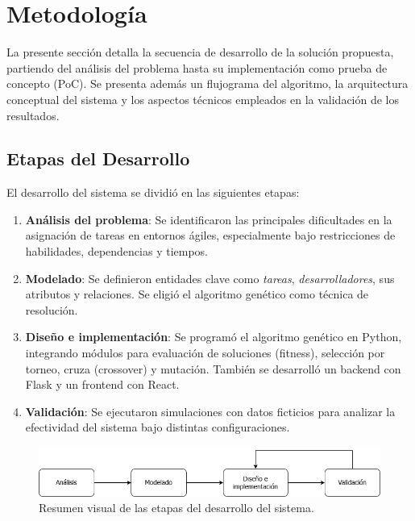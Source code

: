 \newpage

\section{Metodología}

La presente sección detalla la secuencia de desarrollo de la solución propuesta, partiendo del análisis del problema hasta su implementación como prueba de concepto (PoC). Se presenta además un flujograma del algoritmo, la arquitectura conceptual del sistema y los aspectos técnicos empleados en la validación de los resultados.

\subsection{Etapas del Desarrollo}

El desarrollo del sistema se dividió en las siguientes etapas:

\begin{enumerate}
    \item \textbf{Análisis del problema}: Se identificaron las principales dificultades en la asignación de tareas en entornos ágiles, especialmente bajo restricciones de habilidades, dependencias y tiempos.
    \item \textbf{Modelado}: Se definieron entidades clave como \textit{tareas}, \textit{desarrolladores}, sus atributos y relaciones. Se eligió el algoritmo genético como técnica de resolución.
    \item \textbf{Diseño e implementación}: Se programó el algoritmo genético en Python, integrando módulos para evaluación de soluciones (fitness), selección por torneo, cruza (crossover) y mutación. También se desarrolló un backend con Flask y un frontend con React.
    \item \textbf{Validación}: Se ejecutaron simulaciones con datos ficticios para analizar la efectividad del sistema bajo distintas configuraciones.
\end{enumerate}

\begin{figure}[htbp]
    \centering
    \includegraphics[width=12cm]{imagenes/metodo-secuencia.png}
    \caption{Resumen visual de las etapas del desarrollo del sistema.}
    \label{fig:metodologia}
\end{figure}

